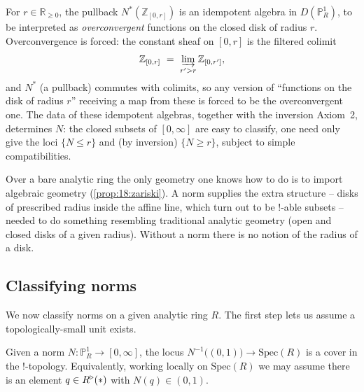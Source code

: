 \begin{remark}
\label{rmk:20:overconvergent-disks}
For $r\in\mathbb R_{\ge0}$, the pullback $N^*(\mathbb Z_{[0,r]})$ is an idempotent
algebra in $D(\mathbb P^1_R)$, to be interpreted as \emph{overconvergent}
functions on the closed disk of radius $r$. Overconvergence is forced: the
constant sheaf on $[0,r]$ is the filtered colimit
\begin{equation*}
\mathbb Z_{[0,r]}\ =\ \varinjlim_{r'>r}\mathbb Z_{[0,r']},
\end{equation*}
and $N^*$ (a pullback) commutes with colimits, so any version of ``functions on
the disk of radius $r$'' receiving a map from these is forced to be the
overconvergent one. The data of these idempotent algebras, together with the
inversion Axiom~2, determines $N$: the closed subsets of $[0,\infty]$ are easy to
classify, one need only give the loci $\{N\le r\}$ and (by inversion)
$\{N\ge r\}$, subject to simple compatibilities.
\end{remark}

\begin{remark}
\label{rmk:20:why-norms}
Over a bare analytic ring the only geometry one knows how to do is to import
algebraic geometry (\cref{prop:18:zariski}). A norm supplies the extra structure
-- disks of prescribed radius inside the affine line, which turn out to be
$!$-able subsets -- needed to do something resembling traditional analytic
geometry (open and closed disks of a given radius). Without a norm there is no
notion of the radius of a disk.
\end{remark}

\subsection{Classifying norms}
\label{subsec:20:classifying}

We now classify norms on a given analytic ring $R$. The first step lets us assume
a topologically-small unit exists.

\begin{lemma}
\label{lem:20:small-element}
Given a norm $N\colon\mathbb P^1_R\to[0,\infty]$, the locus $N^{-1}\bigl((0,1)
\bigr)\to\mathrm{Spec}(R)$ is a cover in the $!$-topology. Equivalently, working
locally on $\mathrm{Spec}(R)$ we may assume there is an element $q\in R^{\triangleright}(\ast)$
with $N(q)\in(0,1)$.
\end{lemma}

